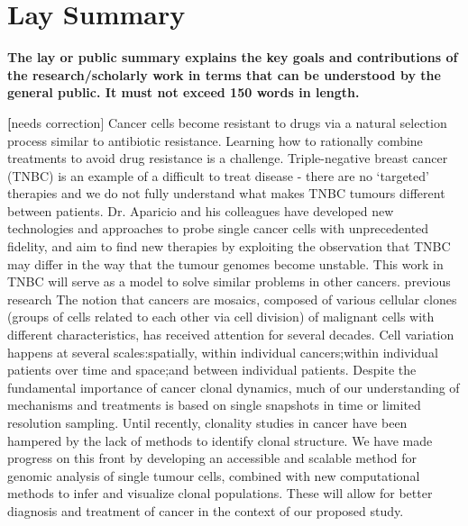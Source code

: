 

\chapter{Lay Summary}

\textbf{The lay or public summary explains the key goals and contributions of
the research\slash{}scholarly work in terms that can be understood by the
general public. It must not exceed 150 words in length.}

\textbf[{needs correction}] Cancer cells become resistant to drugs via a natural selection process similar to antibiotic resistance. Learning
how to rationally combine treatments to avoid drug resistance is a challenge. Triple-negative breast cancer
(TNBC) is an example of a difficult to treat disease - there are no ‘targeted’ therapies and we do not fully
understand what makes TNBC tumours different between patients. Dr. Aparicio and his colleagues have
developed new technologies and approaches to probe single cancer cells with unprecedented fidelity, and aim to
find new therapies by exploiting the observation that TNBC may differ in the way that the tumour genomes
become unstable. This work in TNBC will serve as a model to solve similar problems in other cancers.
previous research
The notion that cancers are mosaics, composed of various cellular clones (groups of cells related to each other
via cell division) of malignant cells with different characteristics, has received attention for several decades. Cell
variation happens at several scales:spatially, within individual cancers;within individual patients over time and
space;and between individual patients. Despite the fundamental importance of cancer clonal dynamics, much of
our understanding of mechanisms and treatments is based on single snapshots in time or limited resolution
sampling. Until recently, clonality studies in cancer have been hampered by the lack of methods to identify clonal
structure. We have made progress on this front by developing an accessible and scalable method for genomic
analysis of single tumour cells, combined with new computational methods to infer and visualize clonal
populations. These will allow for better diagnosis and treatment of cancer in the context of our proposed study.

